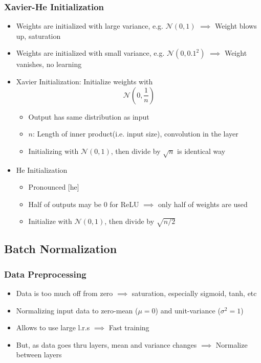 \subsubsection*{Xavier-He Initialization}
\begin{itemize}
    \item Weights are initialized with large variance, e.g. $\mathcal{N}(0,1)$ $\implies$ Weight blows up, saturation
    \item Weights are initialized with small variance, e.g. $\mathcal{N}(0,0.1^2)$ $\implies$ Weight vanishes, no learning
    \item Xavier Initialization: Initialize weights with
    \begin{equation}
        \mathcal{N}\left(0,\frac{1}{n}\right)
    \end{equation}
    \begin{itemize}
        \item Output has same distribution as input
        \item $n$: Length of inner product(i.e. input size), convolution in the layer
        \item Initializing with $\mathcal{N}(0,1)$, then divide by $\sqrt{n}$ is identical way
    \end{itemize}
    \item He Initialization
    \begin{itemize}
        \item Pronounced [he]
        \item Half of outputs may be 0 for ReLU $\implies$ only half of weights are used
        \item Initialize with $\mathcal{N}(0,1)$, then divide by $\sqrt{n/2}$
    \end{itemize}
\end{itemize}
\clearpage
\begin{figures}
\end{figures}

\subsection{Batch Normalization}

\subsubsection*{Data Preprocessing}
\begin{itemize}
    \item Data is too much off from zero $\implies$ saturation, especially sigmoid, tanh, etc
    \item Normalizing input data to zero-mean ($\mu=0$) and unit-variance ($\sigma^2=1$)
    \item Allows to use large l.r.s $\implies$ Fast training
    \item But, as data goes thru layers, mean and variance changes $\implies$ Normalize between layers
\end{itemize}

